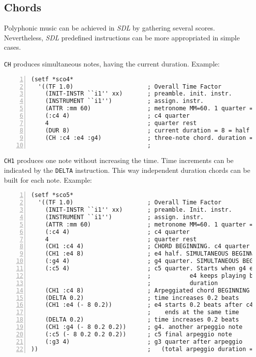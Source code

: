 \subsection{Chords}
Polyphonic music can be achieved in \textit{SDL} by gathering several scores. Nevertheless, \textit{SDL} predefined instructions can be more appropriated in simple cases. \par
\texttt{CH} produces simultaneous notes, having the current duration. Example:
\begin{Verbatim}[frame=single,fontsize=\small,numbers=left,numbersep=2mm,
                 commandchars=+\[\]]
(setf *sco4*
  '((TF 1.0)                     ; Overall Time Factor
    (INIT-INSTR ``i1'' xx)       ; preamble. init. instr.
    (INSTRUMENT ``i1'')          ; assign. instr.
    (ATTR :mm 60)                ; metronome MM=60. 1 quarter = 1 sec.
    (:c4 4)                      ; c4 quarter
    4                            ; quarter rest
    (DUR 8)                      ; current duration = 8 = half
    (CH :c4 :e4 :g4)             ; three-note chord. duration = half
                                 ; 
\end{Verbatim} 
\texttt{CH1} produces one note without increasing the time. Time increments can be indicated by the  \texttt{DELTA} instruction. This way independent duration chords can be built for each note. Example:
\begin{Verbatim}[frame=single,fontsize=\small,numbers=left,numbersep=2mm,
                 commandchars=+\[\]]
(setf *sco5*
  '((TF 1.0)                     ; Overall Time Factor
    (INIT-INSTR ``i1'' xx)       ; preamble. Init. instr.
    (INSTRUMENT ``i1'')          ; assign. instr.
    (ATTR :mm 60)                ; metronome MM=60. 1 quarter = 1 sec.
    (:c4 4)                      ; c4 quarter
    4                            ; quarter rest
    (CH1 :c4 4)                  ; CHORD BEGINNING. c4 quarter
    (CH1 :e4 8)                  ; e4 half. SIMULTANEOUS BEGINNING  c4
    (:g4 4)                      ; g4 quarter. SIMULTANEOUS BEGINNING. c4, e4
    (:c5 4)                      ; c5 quarter. Starts when g4 ends
                                 ;           e4 keeps playing because of the half
                                 ;           duration
    (CH1 :c4 8)                  ; Arpeggiated chord BEGINNING
    (DELTA 0.2)                  ; time increases 0.2 beats
    (CH1 :e4 (- 8 0.2))          ; e4 starts 0.2 beats after c4
                                 ;    ends at the same time
    (DELTA 0.2)                  ; time increases 0.2 beats
    (CH1 :g4 (- 8 0.2 0.2))      ; g4. another arpeggio note
    (:c5 (- 8 0.2 0.2 0.2))      ; c5 final arpeggio note
    (:g3 4)                      ; g3 quarter after arpeggio
))                               ;   (total arpeggio duration = 8)   
\end{Verbatim}


